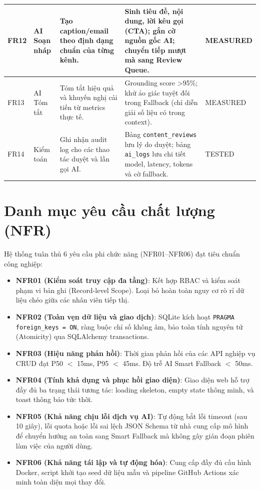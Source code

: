 \begin{small}
\begin{longtable}{|C{0.9cm}|L{1.75cm}|L{3.4cm}|L{4.3cm}|C{2.65cm}|}
\hline
FR12 & AI Soạn nháp & Tạo caption/email theo định dạng chuẩn của từng kênh. & Sinh tiêu đề, nội dung, lời kêu gọi (CTA); gắn cờ nguồn gốc AI; chuyển tiếp mượt mà sang Review Queue. & MEASURED\\
\hline
FR13 & AI Tóm tắt & Tóm tắt hiệu quả và khuyến nghị cải tiến từ metrics thực tế. & Grounding score >95\%; khử ảo giác tuyệt đối trong Fallback (chỉ diễn giải số liệu có trong context). & MEASURED\\
\hline
FR14 & Kiểm toán & Ghi nhận audit log cho các thao tác duyệt và lần gọi AI. & Bảng \texttt{content\_reviews} lưu lý do duyệt; bảng \texttt{ai\_logs} lưu chi tiết model, latency, tokens và cờ fallback. & TESTED\\
\end{longtable}
\end{small}

\section{Danh mục yêu cầu chất lượng (NFR)}

Hệ thống tuân thủ 6 yêu cầu phi chức năng (NFR01--NFR06) đạt tiêu chuẩn công nghiệp:
\begin{itemize}
  \item \textbf{NFR01 (Kiểm soát truy cập đa tầng)}: Kết hợp RBAC và kiểm soát phạm vi bản ghi (Record-level Scope). Loại bỏ hoàn toàn nguy cơ rò rỉ dữ liệu chéo giữa các nhân viên tiếp thị.
  \item \textbf{NFR02 (Toàn vẹn dữ liệu và giao dịch)}: SQLite kích hoạt \texttt{PRAGMA foreign\_keys = ON}, ràng buộc chỉ số không âm, bảo toàn tính nguyên tử (Atomicity) qua SQLAlchemy transactions.
  \item \textbf{NFR03 (Hiệu năng phản hồi)}: Thời gian phản hồi của các API nghiệp vụ CRUD đạt P50 $<$ 15ms, P95 $<$ 45ms. Độ trễ AI Smart Fallback $<$ 50ms.
  \item \textbf{NFR04 (Tính khả dụng và phục hồi giao diện)}: Giao diện web hỗ trợ đầy đủ ba trạng thái tương tác: loading skeleton, empty state thông minh, và toast thông báo tức thời.
  \item \textbf{NFR05 (Khả năng chịu lỗi dịch vụ AI)}: Tự động bắt lỗi timeout (sau 10 giây), lỗi quota hoặc lỗi sai lệch JSON Schema từ nhà cung cấp mô hình để chuyển hướng an toàn sang Smart Fallback mà không gây gián đoạn phiên làm việc của người dùng.
  \item \textbf{NFR06 (Khả năng tái lập và tự động hóa)}: Cung cấp đầy đủ cấu hình Docker, script khởi tạo seed dữ liệu mẫu và pipeline GitHub Actions xác minh toàn diện mọi thay đổi.
\end{itemize}


